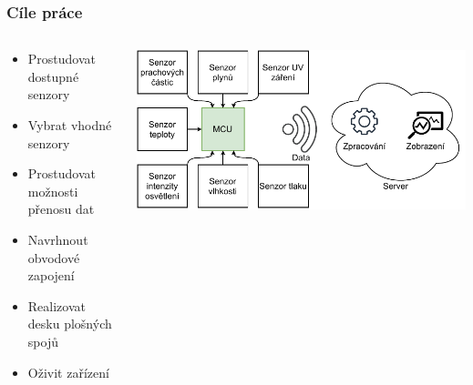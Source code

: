 \documentclass[%
  12pt,       				%
	t,                  %
	aspectratio=1610,   %
	unicode,						%
]{beamer}				    	%
\begin{document}
\disablenavigationsymbols

\maketitle

\begin{frame} 
	\frametitle{Cíle práce}
	\begin{columns}[T]
		\begin{column}{0.4\textwidth}
			\vspace{0.5cm}
			\begin{itemize}
				\item Prostudovat dostupné senzory
				\item Vybrat vhodné senzory
				\item Prostudovat možnosti přenosu dat
				\item Navrhnout obvodové zapojení
				\item Realizovat desku plošných spojů
				\item Oživit zařízení
			\end{itemize}
		\end{column}

		\begin{column}{0.6\textwidth}
			\centering
			\vspace{1.5cm}
			\includegraphics[width=\columnwidth]{obrazky/block_schematic-blank.drawio.pdf}
		\end{column}
	\end{columns}
	
\end{frame}
\end{document}
